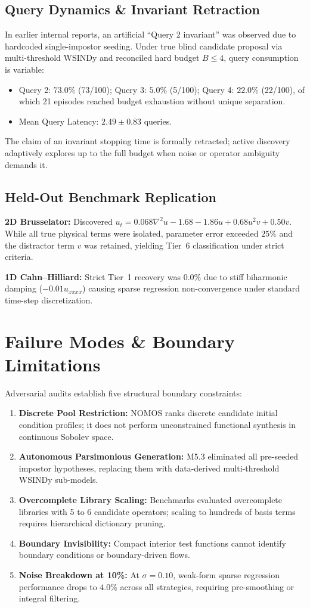 \documentclass[twocolumn,10pt,a4paper]{article}
\begin{document}
\subsection{Query Dynamics \& Invariant Retraction}
In earlier internal reports, an artificial ``Query 2 invariant'' was observed due to hardcoded single-impostor seeding. Under true blind candidate proposal via multi-threshold WSINDy and reconciled hard budget $B \le 4$, query consumption is variable:
\begin{itemize}
    \item Query 2: $73.0\%$ (73/100); Query 3: $5.0\%$ (5/100); Query 4: $22.0\%$ (22/100), of which 21 episodes reached budget exhaustion without unique separation.
    \item Mean Query Latency: $2.49 \pm 0.83$ queries.
\end{itemize}
The claim of an invariant stopping time is formally retracted; active discovery adaptively explores up to the full budget when noise or operator ambiguity demands it.

\subsection{Held-Out Benchmark Replication}
\textbf{2D Brusselator:} Discovered $u_t = 0.068 \nabla^2 u - 1.68 - 1.86 u + 0.68 u^2 v + 0.50 v$. While all true physical terms were isolated, parameter error exceeded $25\%$ and the distractor term $v$ was retained, yielding Tier~6 classification under strict criteria.

\textbf{1D Cahn--Hilliard:} Strict Tier~1 recovery was $0.0\%$ due to stiff biharmonic damping ($-0.01 u_{xxxx}$) causing sparse regression non-convergence under standard time-step discretization.

\section{Failure Modes \& Boundary Limitations}
Adversarial audits establish five structural boundary constraints:
\begin{enumerate}
    \item \textbf{Discrete Pool Restriction:} NOMOS ranks discrete candidate initial condition profiles; it does not perform unconstrained functional synthesis in continuous Sobolev space.
    \item \textbf{Autonomous Parsimonious Generation:} M5.3 eliminated all pre-seeded impostor hypotheses, replacing them with data-derived multi-threshold WSINDy sub-models.
    \item \textbf{Overcomplete Library Scaling:} Benchmarks evaluated overcomplete libraries with 5 to 6 candidate operators; scaling to hundreds of basis terms requires hierarchical dictionary pruning.
    \item \textbf{Boundary Invisibility:} Compact interior test functions cannot identify boundary conditions or boundary-driven flows.
    \item \textbf{Noise Breakdown at 10\%:} At $\sigma = 0.10$, weak-form sparse regression performance drops to $4.0\%$ across all strategies, requiring pre-smoothing or integral filtering.
\end{enumerate}
\end{document}
